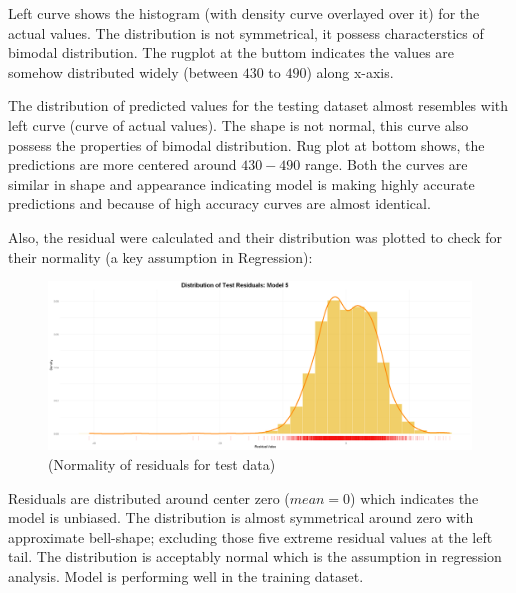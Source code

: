 \documentclass[12pt,a4paper]{article}
\begin{document}
Left curve shows the histogram (with density curve overlayed over it) for the actual values. 
The distribution is not symmetrical, it possess characterstics of
bimodal distribution. The rugplot at the buttom indicates the values are somehow distributed widely 
(between $430$ to $490$) along x-axis.

The distribution of predicted values for the testing dataset almost resembles with left curve (curve of actual values). 
The shape is not normal, this curve also possess the properties of bimodal distribution. 
Rug plot at bottom shows, the predictions are more centered around $430-490$
range. Both the curves are similar in shape and appearance indicating model is making
highly accurate predictions and because of high accuracy 
curves are almost identical. 

Also, the residual were calculated and their distribution was plotted to check for
their normality (a key assumption in Regression):

\begin{figure}[H]
  \centering
  \includegraphics[width=\textwidth]{r21.png}
  \caption{(Normality of residuals for test data)}
  \label{fig:Distribution of residuals for testing data}
\end{figure}


Residuals are distributed around center zero ($mean= 0$) which indicates the model is unbiased. 
The distribution is almost symmetrical around zero with approximate bell-shape; excluding those five 
extreme residual values at the left tail. 
The distribution is acceptably normal which is the assumption in regression analysis. 
Model is performing well in the training dataset.
\end{document}
